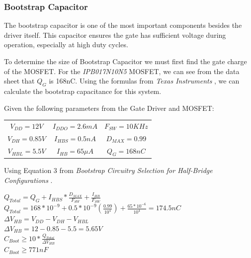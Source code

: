 \documentclass{article}
\begin{document}
		\subsubsection{Bootstrap Capacitor}
		The bootstrap capacitor is one of the most important components besides the driver itself.  This capacitor ensures the gate has sufficient voltage during operation, especially at high duty cycles. 
		
		\noindent To determine the size of Bootstrap Capacitor we must first find the gate charge of the MOSFET.  For the \textit{IPB017N10N5} MOSFET, we can see from the data sheet that $Q_G$ is 168nC.  Using the formulas from \textit{Texas Instruments} \cite{Bootstrap Equations}, we can calculate the bootstrap capacitance for this system.
		
		\vspace{3mm}
		\noindent Given the following parameters from the Gate Driver and MOSFET:
		
		\begin{center}
			\begin{tabular}{ c c c }
			$V_{DD} = 12V$ & $I_{DDO} = 2.6mA$ & $F_{SW} = 10KHz$ \\
			$V_{DH} = 0.85V$ & $I_{HBS} = 0.5nA$ & $D_{MAX} = 0.99$ \\
			$V_{HBL} = 5.5V$& $I_{HB} = 65\mu A$ & $Q_G = 168nC$ \\
			\end{tabular}
		\end{center}

		Using Equation 3 from \textit{Bootstrap Circuitry Selection for Half-Bridge Configurations} \cite{Bootstrap Equations}.
			
		\begin{center}
			$Q_{Total} = Q_G + I_{HBS}*\frac{D_{MAX}}{F_{SW}} + \frac{I_{HB}}{F_{SW}}$ \\
			\vspace{3mm}  
			$Q_{Total} = 168*10^{-9} + 0.5*10^{-9}(\frac{0.99}{10^4}) + \frac{65*10^{-6}}{10^4} = 174.5nC$ \\
			\vspace{3mm}
			$\Delta V_{HB} = V_{DD} - V_{DH} - V_{HBL}$ \\
			\vspace{3mm}
			$\Delta V_{HB} = 12 - 0.85 - 5.5 = 5.65V$ \\
			\vspace{3mm}
			$C_{Boot} \ge 10*\frac{Q_{Total}}{\Delta V_{HB}}$ \\
			\vspace{3mm}
			$C_{Boot} \ge 771nF$ \\
		\end{center}
		
\end{document}
